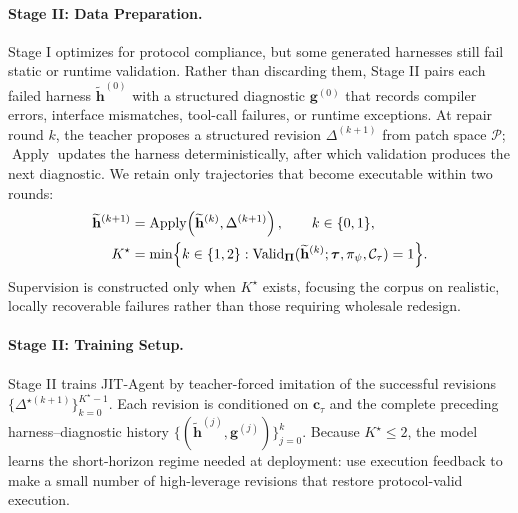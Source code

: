 \documentclass{article}
\newcommand{\ourmethod}{JIT-Agent\xspace}
\begin{document}
\paragraph{Stage II: Data Preparation.}
Stage I optimizes for protocol compliance, but some generated harnesses still fail static or runtime validation. Rather than discarding them, Stage II pairs each failed harness $\widetilde{\mathbf{h}}^{(0)}$ with a structured diagnostic $\mathbf{g}^{(0)}$ that records compiler errors, interface mismatches, tool-call failures, or runtime exceptions. At repair round $k$, the teacher proposes a structured revision $\Delta^{(k+1)}$ from patch space $\mathcal{P}$; $\operatorname{Apply}$ updates the harness deterministically, after which validation produces the next diagnostic. We retain only trajectories that become executable within two rounds:
\begin{equation}
\label{eq:stage2_repair}
\begin{aligned}
\widetilde{\mathbf{h}}^{(k+1)}
&= \operatorname{Apply}\!\left(\widetilde{\mathbf{h}}^{(k)},\Delta^{(k+1)}\right), \qquad k\in\{0,1\},\\
K^{\star}
&= \min\Bigl\{k\in\{1,2\}:\operatorname{Valid}_{\boldsymbol{\Pi}}(\widetilde{\mathbf{h}}^{(k)};\boldsymbol{\tau},\pi_{\psi},\mathcal{C}_{\tau})=1\Bigr\}.
\end{aligned}
\end{equation}
Supervision is constructed only when $K^{\star}$ exists, focusing the corpus on realistic, locally recoverable failures rather than those requiring wholesale redesign.

\vspace{-0.5em}
\paragraph{Stage II: Training Setup.}
Stage II trains \ourmethod by teacher-forced imitation of the successful revisions $\{\Delta^{\star(k+1)}\}_{k=0}^{K^{\star}-1}$. Each revision is conditioned on $\mathbf{c}_{\tau}$ and the complete preceding harness--diagnostic history $\{(\widetilde{\mathbf{h}}^{(j)},\mathbf{g}^{(j)})\}_{j=0}^{k}$. Because $K^{\star}\le 2$, the model learns the short-horizon regime needed at deployment: use execution feedback to make a small number of high-leverage revisions that restore protocol-valid execution.

\vspace{-0.5em}
\end{document}
